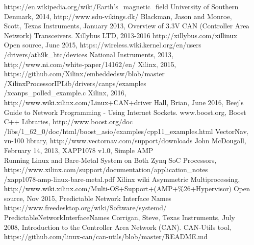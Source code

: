 \begin{thebibliography}{11} %
		https://en.wikipedia.org/wiki/Earth's\_magnetic\_field
		University of Southern Denmark, 2014, http://www.sdu-vikings.dk/
		Blackman, Jason and Monroe, Scott, Texas Instruments, January 2013, Overview of 3.3V CAN (Controller Area Network) Transceivers.
		Xillybus LTD, 2013-2016 http://xillybus.com/xillinux
		Open source, June 2015, https://wireless.wiki.kernel.org/en/users\\
		/drivers/ath9k\_htc/devices
		National Instruments, 2013, http://www.ni.com/white-paper/14162/en/
		Xilinx, 2015, https://github.com/Xilinx/embeddedsw/blob/master\\
		/XilinxProcessorIPLib/drivers/canps/examples\\
		/xcanps\_polled\_example.c
		Xilinx, 2016, http://www.wiki.xilinx.com/Linux+CAN+driver
		Hall, Brian, June 2016, Beej's Guide to Network Programming - Using Internet Sockets.
		www.boost.org, Boost C++ Libraries, http://www.boost.org/doc \\
		/libs/1\_62\_0/doc/html/boost\_asio/examples/cpp11\_examples.html
		VectorNav, vn-100 library, http://www.vectornav.com/support/downloads
		John McDougall, February 14, 2013, XAPP1078 v1.0, Simple AMP\\
		Running Linux and Bare-Metal System on Both Zynq SoC Processors,\\
		https://www.xilinx.com/support/documentation/application\_notes\\
		/xapp1078-amp-linux-bare-metal.pdf
		Xilinx wiki Asymmetric Multiprocessing,\\
		http://www.wiki.xilinx.com/Multi-OS+Support+(AMP+\%26+Hypervisor)
		Open source, Nov 2015, Predictable Network Interface Names \\
		https://www.freedesktop.org/wiki/Software/systemd/\\
		PredictableNetworkInterfaceNames
			Corrigan, Steve, Texas Instruments, July 2008, Introduction to the Controller Area Network (CAN).
			CAN-Utils tool, https://github.com/linux-can/can-utils/blob/master/README.md
\end{thebibliography}
